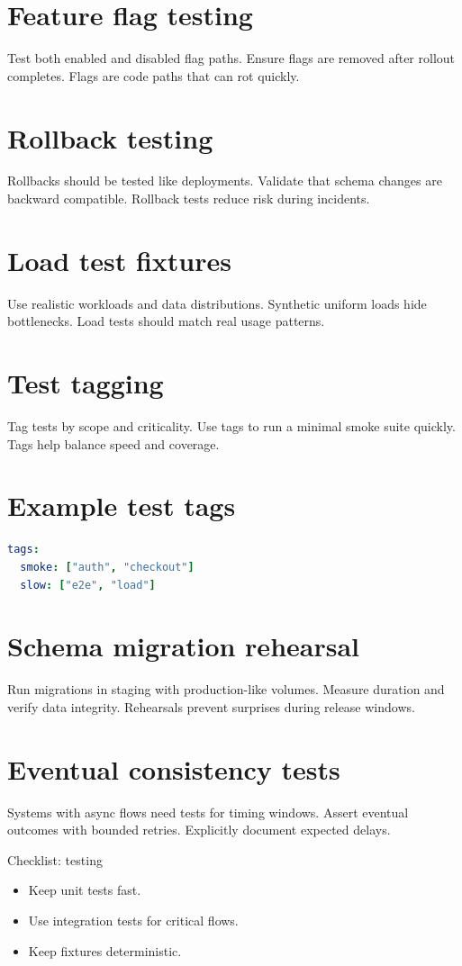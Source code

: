 \section{Feature flag testing}
Test both enabled and disabled flag paths.
Ensure flags are removed after rollout completes.
Flags are code paths that can rot quickly.

\section{Rollback testing}
Rollbacks should be tested like deployments.
Validate that schema changes are backward compatible.
Rollback tests reduce risk during incidents.

\section{Load test fixtures}
Use realistic workloads and data distributions.
Synthetic uniform loads hide bottlenecks.
Load tests should match real usage patterns.

\section{Test tagging}
Tag tests by scope and criticality.
Use tags to run a minimal smoke suite quickly.
Tags help balance speed and coverage.

\section{Example test tags}
\begin{lstlisting}[language=YAML]
tags:
  smoke: ["auth", "checkout"]
  slow: ["e2e", "load"]
\end{lstlisting}

\section{Schema migration rehearsal}
Run migrations in staging with production-like volumes.
Measure duration and verify data integrity.
Rehearsals prevent surprises during release windows.

\section{Eventual consistency tests}
Systems with async flows need tests for timing windows.
Assert eventual outcomes with bounded retries.
Explicitly document expected delays.

\begin{checklistbox}{Checklist: testing}
\begin{itemize}[nosep]
  \item Keep unit tests fast.
  \item Use integration tests for critical flows.
  \item Keep fixtures deterministic.
\end{itemize}
\end{checklistbox}
